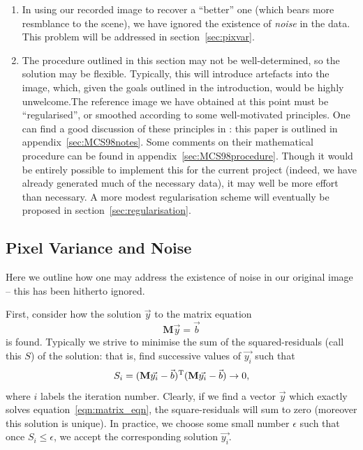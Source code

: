 \documentclass[letterpaper, 11pt]{article}
\def\ra{\ensuremath{\rightarrow}\xspace}
\begin{document}
\begin{enumerate}
	\item In using our recorded image to recover a ``better'' one (which bears more resmblance to the scene), we have ignored the existence of \emph{noise} in the data. This problem will be addressed in section~\vref{sec:pixvar}.
	
	\item The procedure outlined in this section may not be well-determined, so the solution may be flexible. Typically, this will introduce artefacts into the image, which, given the goals outlined in the introduction, would be highly unwelcome.\newline The reference image we have obtained at this point must be ``regularised'', or smoothed according to some well-motivated principles. One can find a good discussion of these principles in \citet{MCS98}: this paper is outlined in appendix~\ref{sec:MCS98notes}. Some comments on their mathematical procedure can be found in appendix~\ref{sec:MCS98procedure}. \newline Though it would be entirely possible to implement this for the current project (indeed, we have already generated much of the necessary data), it may well be more effort than necessary. A more modest regularisation scheme will eventually be proposed in section~\ref{sec:regularisation}.
\end{enumerate}




\subsection{Pixel Variance and Noise}
\label{sec:pixvar}

Here we outline how one may address the existence of noise in our original image -- this has been hitherto ignored.

First, consider how the solution $\vec y$ to the matrix equation
\begin{equation}
	\mathbf M \vec y = \vec b \label{eqn:matrix_eqn}
\end{equation}
is found. Typically we strive to minimise the sum of the squared-residuals (call this $S$) of the solution: that is, find successive values of $\vec {y_i}$ such that
\begin{equation} \label{eqn:sum_residuals}
	S_i = (\mathbf M \vec{y_i} - \vec b)^{\rm T}(\mathbf M \vec{y_i} - \vec b) \ra 0,
\end{equation}
where $i$ labels the iteration number. Clearly, if we find a vector $\vec y$ which exactly solves equation~\ref{eqn:matrix_eqn}, the square-residuals will sum to zero (moreover this solution is unique). In practice, we choose some small number $\epsilon$ such that once $S_i \leq \epsilon$, we accept the corresponding solution $\vec {y_i}$.
\end{document}
